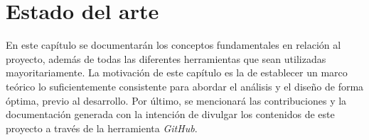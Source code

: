 \chapter{Estado del arte}
\label{estadoArte}

En este capítulo se documentarán los conceptos fundamentales en relación al proyecto, además de todas las diferentes herramientas que sean utilizadas mayoritariamente. La motivación de este capítulo es la de establecer un marco teórico lo suficientemente consistente para abordar el análisis y el diseño de forma óptima, previo al desarrollo. Por último, se mencionará las contribuciones y la documentación generada con la intención de divulgar los contenidos de este proyecto a través de la herramienta \textit{GitHub}.



















